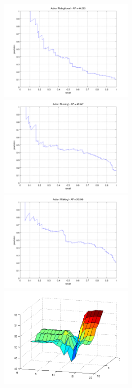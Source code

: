 \documentclass[10pt,a4paper]{llncs}
\begin{document}
\begin{figure}
\begin{minipage}{0.5\linewidth}
\end{minipage}
\begin{minipage}{0.5\linewidth}
\includegraphics[height=5cm]{img/SVM_BOF_PR_RidingHorse.png}
\end{minipage}
\begin{minipage}{0.5\linewidth}
\includegraphics[height=5cm]{img/SVM_BOF_PR_Running.png}
\end{minipage}
\begin{minipage}{0.5\linewidth}
\includegraphics[height=5cm]{img/SVM_BOF_PR_Walking.png}
\end{minipage}
\begin{minipage}{0.5\linewidth}
\includegraphics[height=5cm]{img/SVM_BOF_CV.png}
\end{minipage}
\end{figure}
\end{document}
